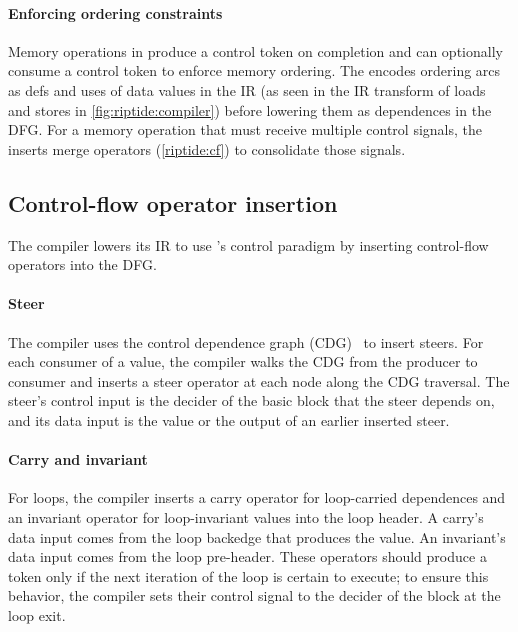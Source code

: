 \paragraph{Enforcing ordering constraints} Memory operations in \riptide 
produce a control token on completion and can optionally consume a
control token to enforce memory ordering.
%
The \mend encodes ordering arcs as defs and uses of data values in the IR
(as seen in the IR transform of loads and stores in \autoref{fig:riptide:compiler})
before lowering them as dependences in the DFG.
%
For a memory operation that must receive multiple control signals,
the \mend inserts merge operators (\autoref{riptide:cf}) to consolidate those signals.

\subsection{Control-flow operator insertion}

The compiler lowers its IR to use \riptide's control paradigm by inserting \riptide
control-flow operators into the DFG.
%

\paragraph{Steer}
%
The compiler uses the control dependence graph (CDG)~\cite{cytron} to 
insert steers.
%
For each consumer of a value, the compiler walks the CDG from the producer
to consumer
and inserts a steer operator at
each node along the CDG traversal. 
%
The steer's control input is the decider of the basic block that the steer depends on,
and its data input is the value or the output of an earlier inserted steer.
%

\paragraph{Carry and invariant}
%
For loops, the compiler inserts a carry operator for loop-carried dependences
and an invariant operator for loop-invariant values
into the loop header.
%
A carry's data
input comes from the loop backedge that produces the value.  An invariant's
data input comes from the loop pre-header.
%
These operators should produce a token only if the next iteration of the loop is
certain to execute; to ensure this behavior, the compiler sets their control
signal to the decider of the block at the loop exit. 
%

